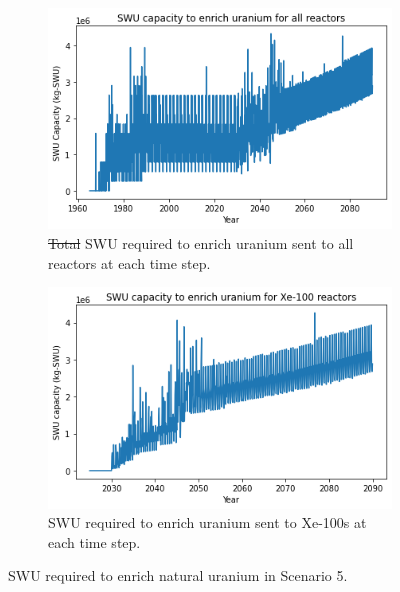 \documentclass[preprint]{elsarticle}
\providecommand{\DIFdeltex}[1]{{\protect\color{red}\sout{#1}}}                      %
\providecommand{\DIFdelFL}[1]{\DIFdel{#1}} %
\providecommand{\DIFaddbeginFL}{} %
\providecommand{\DIFaddendFL}{} %
\providecommand{\DIFdelbeginFL}{} %
\providecommand{\DIFdelendFL}{} %
\providecommand{\DIFdel}[1]{\texorpdfstring{\DIFdeltex{#1}}{}} %
\begin{document}
\begin{figure}
    \centering
    \DIFdelbeginFL %
\DIFdelendFL \DIFaddbeginFL \begin{subfigure}{0.45\textwidth}
        \DIFaddendFL \centering
        \DIFdelbeginFL %
\DIFdelendFL \DIFaddbeginFL \includegraphics[scale=0.4]{../figures/totalswu_scenarios_5.png}
        \DIFaddendFL \caption{\DIFdelbeginFL \DIFdelFL{Total }\DIFdelendFL \gls{SWU} required to enrich uranium sent to all reactors at each time step.}
        \label{fig:totalswu_5}
    \end{subfigure}
    \hspace{0.8cm}
    \DIFdelbeginFL %
\DIFdelendFL \DIFaddbeginFL \begin{subfigure}{0.45\textwidth}
        \DIFaddendFL \centering
        \DIFdelbeginFL %
\DIFdelendFL \DIFaddbeginFL \includegraphics[scale=0.4]{../figures/haleuSWU_scenarios_5.png}
        \DIFaddendFL \caption{\gls{SWU} required to enrich uranium sent to Xe-100s at each time step.}
        \label{fig:haleuswu_5}
    \end{subfigure}
    \caption{\gls{SWU} required to enrich natural uranium in Scenario 5.}
    \label{fig:swu_5}
\end{figure}
\end{document}
